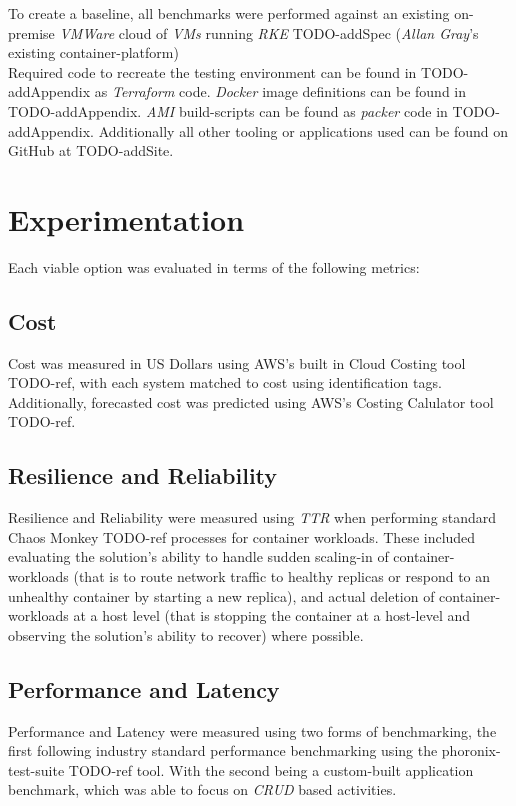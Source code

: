 To create a baseline, all benchmarks were performed against an existing on-premise \emph{VMWare} cloud of \emph{VMs} running \emph{RKE} TODO-addSpec (\emph{Allan Gray}'s existing container-platform) \\

\noindent Required code to recreate the testing environment can be found in TODO-addAppendix as \emph{Terraform} code.
\emph{Docker} image definitions can be found in TODO-addAppendix.
\emph{AMI} build-scripts can be found as \emph{packer} code in TODO-addAppendix.
Additionally all other tooling or applications used can be found on GitHub at TODO-addSite.

\chapter{Experimentation}
Each viable option was evaluated in terms of the following metrics:
\section{Cost}
Cost was measured in US Dollars using AWS's built in Cloud Costing tool TODO-ref, with each system matched to cost using identification tags.
Additionally, forecasted cost was predicted using AWS's Costing Calulator tool TODO-ref.

\section{Resilience and Reliability}
Resilience and Reliability were measured using \textit{TTR} when performing standard Chaos Monkey TODO-ref processes for container workloads.
These included evaluating the solution's ability to handle sudden scaling-in of container-workloads (that is to route network traffic to healthy replicas or respond to an unhealthy container by starting a new replica),
and actual deletion of container-workloads at a host level (that is stopping the container at a host-level and observing the solution's ability to recover) where possible.

\section{Performance and Latency}
Performance and Latency were measured using two forms of benchmarking, the first following industry standard performance benchmarking using the phoronix-test-suite TODO-ref tool.
With the second being a custom-built application benchmark, which was able to focus on \emph{CRUD} based activities.

